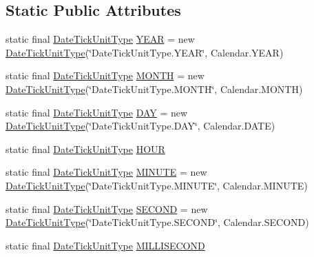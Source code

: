 \subsection*{Static Public Attributes}
\begin{DoxyCompactItemize}
\item 
static final \mbox{\hyperlink{classorg_1_1jfree_1_1chart_1_1axis_1_1_date_tick_unit_type}{Date\+Tick\+Unit\+Type}} \mbox{\hyperlink{classorg_1_1jfree_1_1chart_1_1axis_1_1_date_tick_unit_type_a8b70b7582857b76185a3e97c90e2ef9c}{Y\+E\+AR}} = new \mbox{\hyperlink{classorg_1_1jfree_1_1chart_1_1axis_1_1_date_tick_unit_type}{Date\+Tick\+Unit\+Type}}(\char`\"{}Date\+Tick\+Unit\+Type.\+Y\+E\+AR\char`\"{}, Calendar.\+Y\+E\+AR)
\item 
static final \mbox{\hyperlink{classorg_1_1jfree_1_1chart_1_1axis_1_1_date_tick_unit_type}{Date\+Tick\+Unit\+Type}} \mbox{\hyperlink{classorg_1_1jfree_1_1chart_1_1axis_1_1_date_tick_unit_type_a753093093e45d2265920eeccd72fc438}{M\+O\+N\+TH}} = new \mbox{\hyperlink{classorg_1_1jfree_1_1chart_1_1axis_1_1_date_tick_unit_type}{Date\+Tick\+Unit\+Type}}(\char`\"{}Date\+Tick\+Unit\+Type.\+M\+O\+N\+TH\char`\"{}, Calendar.\+M\+O\+N\+TH)
\item 
static final \mbox{\hyperlink{classorg_1_1jfree_1_1chart_1_1axis_1_1_date_tick_unit_type}{Date\+Tick\+Unit\+Type}} \mbox{\hyperlink{classorg_1_1jfree_1_1chart_1_1axis_1_1_date_tick_unit_type_a26b629f36cb016fb5efddebd100fb4a1}{D\+AY}} = new \mbox{\hyperlink{classorg_1_1jfree_1_1chart_1_1axis_1_1_date_tick_unit_type}{Date\+Tick\+Unit\+Type}}(\char`\"{}Date\+Tick\+Unit\+Type.\+D\+AY\char`\"{}, Calendar.\+D\+A\+TE)
\item 
static final \mbox{\hyperlink{classorg_1_1jfree_1_1chart_1_1axis_1_1_date_tick_unit_type}{Date\+Tick\+Unit\+Type}} \mbox{\hyperlink{classorg_1_1jfree_1_1chart_1_1axis_1_1_date_tick_unit_type_af1fc3a781d48ca0bfeb17317613adff6}{H\+O\+UR}}
\item 
static final \mbox{\hyperlink{classorg_1_1jfree_1_1chart_1_1axis_1_1_date_tick_unit_type}{Date\+Tick\+Unit\+Type}} \mbox{\hyperlink{classorg_1_1jfree_1_1chart_1_1axis_1_1_date_tick_unit_type_a46e58532c688513164ea6441e93f2448}{M\+I\+N\+U\+TE}} = new \mbox{\hyperlink{classorg_1_1jfree_1_1chart_1_1axis_1_1_date_tick_unit_type}{Date\+Tick\+Unit\+Type}}(\char`\"{}Date\+Tick\+Unit\+Type.\+M\+I\+N\+U\+TE\char`\"{}, Calendar.\+M\+I\+N\+U\+TE)
\item 
static final \mbox{\hyperlink{classorg_1_1jfree_1_1chart_1_1axis_1_1_date_tick_unit_type}{Date\+Tick\+Unit\+Type}} \mbox{\hyperlink{classorg_1_1jfree_1_1chart_1_1axis_1_1_date_tick_unit_type_a88058bf36dcefb7473c6f9042729bbe7}{S\+E\+C\+O\+ND}} = new \mbox{\hyperlink{classorg_1_1jfree_1_1chart_1_1axis_1_1_date_tick_unit_type}{Date\+Tick\+Unit\+Type}}(\char`\"{}Date\+Tick\+Unit\+Type.\+S\+E\+C\+O\+ND\char`\"{}, Calendar.\+S\+E\+C\+O\+ND)
\item 
static final \mbox{\hyperlink{classorg_1_1jfree_1_1chart_1_1axis_1_1_date_tick_unit_type}{Date\+Tick\+Unit\+Type}} \mbox{\hyperlink{classorg_1_1jfree_1_1chart_1_1axis_1_1_date_tick_unit_type_a34b26fe04b1b24efee1afb7d27eeeb39}{M\+I\+L\+L\+I\+S\+E\+C\+O\+ND}}
\end{DoxyCompactItemize}


